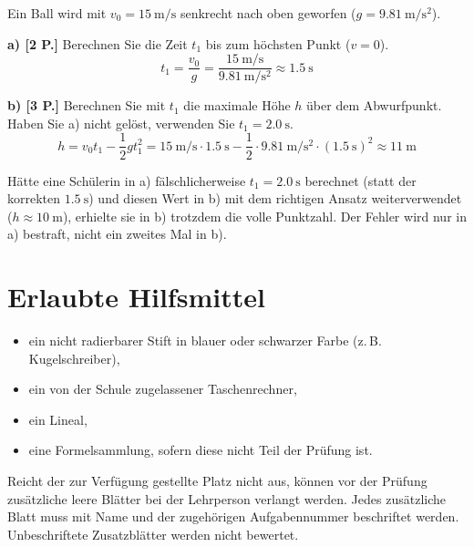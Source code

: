 \documentclass[11pt,a4paper]{article}
\begin{document}
\begin{beispielbox}
Ein Ball wird mit $v_0 = \SI{15}{\meter\per\second}$ senkrecht nach oben
geworfen ($g = \SI{9.81}{\meter\per\second\squared}$).

\textbf{a) [2 P.]} Berechnen Sie die Zeit $t_1$ bis zum höchsten Punkt
($v = 0$).
\[
t_1 = \frac{v_0}{g} = \frac{\SI{15}{\meter\per\second}}{\SI{9.81}{\meter\per\second\squared}} \approx \SI{1.5}{\second}
\]

\textbf{b) [3 P.]} Berechnen Sie mit $t_1$ die maximale Höhe $h$ über dem
Abwurfpunkt. Haben Sie a) nicht gelöst, verwenden Sie
$t_1 = \SI{2.0}{\second}$.
\[
h = v_0 t_1 - \frac{1}{2} g t_1^2
  = \SI{15}{\meter\per\second} \cdot \SI{1.5}{\second}
  - \frac{1}{2} \cdot \SI{9.81}{\meter\per\second\squared} \cdot (\SI{1.5}{\second})^2
  \approx \SI{11}{\meter}
\]

Hätte eine Schülerin in a) fälschlicherweise $t_1 = \SI{2.0}{\second}$
berechnet (statt der korrekten $\SI{1.5}{\second}$) und diesen Wert in b)
mit dem richtigen Ansatz weiterverwendet
($h \approx \SI{10}{\meter}$), erhielte sie in b) trotzdem die volle
Punktzahl. Der Fehler wird nur in a) bestraft, nicht ein zweites Mal in b).
\end{beispielbox}

\section*{Erlaubte Hilfsmittel}

\begin{infobox}[Mitzubringen]
\begin{itemize}
  \item ein nicht radierbarer Stift in blauer oder schwarzer Farbe
    (z.\,B. Kugelschreiber),
  \item ein von der Schule zugelassener Taschenrechner,
  \item ein Lineal,
  \item eine Formelsammlung, sofern diese nicht Teil der Prüfung ist.
\end{itemize}
\end{infobox}

\begin{infobox}
Reicht der zur Verfügung gestellte Platz nicht aus, können vor der
Prüfung zusätzliche leere Blätter bei der Lehrperson verlangt werden.
Jedes zusätzliche Blatt muss mit Name und der zugehörigen Aufgabennummer
beschriftet werden. Unbeschriftete Zusatzblätter werden nicht bewertet.
\end{infobox}
\end{document}
